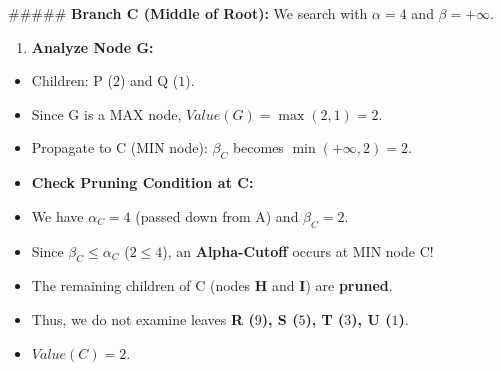 \#\#\#\#\# \textbf{Branch C (Middle of Root):}
We search with $\alpha = 4$ and $\beta = +\infty$.
\begin{enumerate}
  \item \textbf{Analyze Node G:}
\end{enumerate}
\begin{itemize}
  \item   Children: P ($2$) and Q ($1$).
  \item   Since G is a MAX node, $Value(G) = \max(2, 1) = 2$.
  \item   Propagate to C (MIN node): $\beta_C$ becomes $\min(+\infty, 2) = 2$.
  \item   \textbf{Check Pruning Condition at C:}
  \item   We have $\alpha_C = 4$ (passed down from A) and $\beta_C = 2$.
  \item   Since $\beta_C \le \alpha_C$ ($2 \le 4$), an \textbf{Alpha-Cutoff} occurs at MIN node C!
  \item   The remaining children of C (nodes \textbf{H} and \textbf{I}) are \textbf{pruned}.
  \item   Thus, we do not examine leaves \textbf{R ($9$), S ($5$), T ($3$), U ($1$)}.
  \item   $Value(C) = 2$.
\end{itemize}



